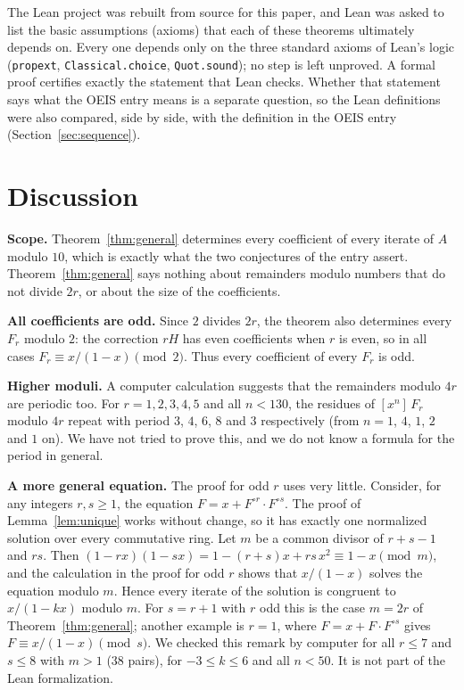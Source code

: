 \documentclass[11pt,a4paper]{article}
\theoremstyle{definition}
\theoremstyle{remark}
\newcommand{\coeff}[2]{[x^{#1}]\,#2}
\newcommand{\para}[1]{\par\medskip\noindent\textbf{#1}\enspace}
\begin{document}
The Lean project was rebuilt from source for this paper, and Lean was asked to list the basic assumptions (axioms)
that each of these theorems ultimately depends on. Every one depends only on the three standard axioms of Lean's logic
(\texttt{propext}, \texttt{Classical.choice}, \texttt{Quot.sound}); no step is left unproved. A formal proof certifies
exactly the statement that Lean checks. Whether that statement says what the OEIS entry means is a separate question,
so the Lean definitions were also compared, side by side, with the definition in the OEIS entry
(Section~\ref{sec:sequence}).

\section{Discussion}\label{sec:discussion}

\para{Scope.} Theorem~\ref{thm:general} determines every coefficient of every iterate of $A$ modulo $10$, which is
exactly what the two conjectures of the entry assert. Theorem~\ref{thm:general} says nothing about remainders modulo numbers that do
not divide $2r$, or about the size of the coefficients.

\para{All coefficients are odd.} Since $2$ divides $2r$, the theorem also determines every $F_r$ modulo $2$: the
correction $rH$ has even coefficients when $r$ is even, so in all cases $F_r\equiv x/(1-x)\pmod2$. Thus every
coefficient of every $F_r$ is odd.

\para{Higher moduli.} A computer calculation suggests that the remainders modulo $4r$ are periodic too. For $r=1,2,3,4,5$
and all $n<130$, the residues of $\coeff{n}{F_r}$ modulo $4r$ repeat with period $3$, $4$, $6$, $8$ and $3$
respectively (from $n=1$, $4$, $1$, $2$ and $1$ on). We have not tried to prove this, and we do not know a formula for
the period in general.

\para{A more general equation.} The proof for odd $r$ uses very little. Consider, for any integers $r,s\ge1$, the
equation $F=x+F^{\circ r}\cdot F^{\circ s}$. The proof of Lemma~\ref{lem:unique} works without change, so it has exactly
one normalized solution over every commutative ring. Let $m$ be a common divisor of $r+s-1$ and $rs$. Then
$(1-rx)(1-sx)=1-(r+s)x+rs\,x^2\equiv1-x\pmod m$, and the calculation in the proof for odd $r$ shows that
$x/(1-x)$ solves the equation modulo $m$. Hence every iterate of the solution is congruent to $x/(1-kx)$ modulo $m$.
For $s=r+1$ with $r$ odd this is the case $m=2r$ of Theorem~\ref{thm:general}; another example is $r=1$, where
$F=x+F\cdot F^{\circ s}$ gives $F\equiv x/(1-x)\pmod s$. We checked this remark by computer for all $r\le7$ and
$s\le8$ with $m>1$ ($38$ pairs), for $-3\le k\le6$ and all $n<50$. It is not part of the Lean formalization.
\end{document}
